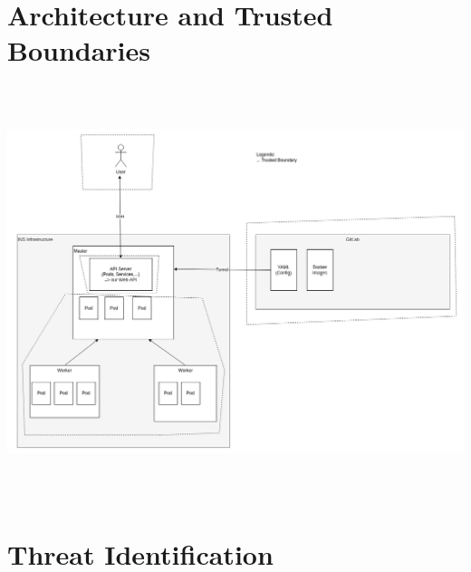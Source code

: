 \section{Architecture and Trusted Boundaries}

\includegraphics[height=12cm]{resources/architecture_threat_model.png}


\section{Threat Identification}

